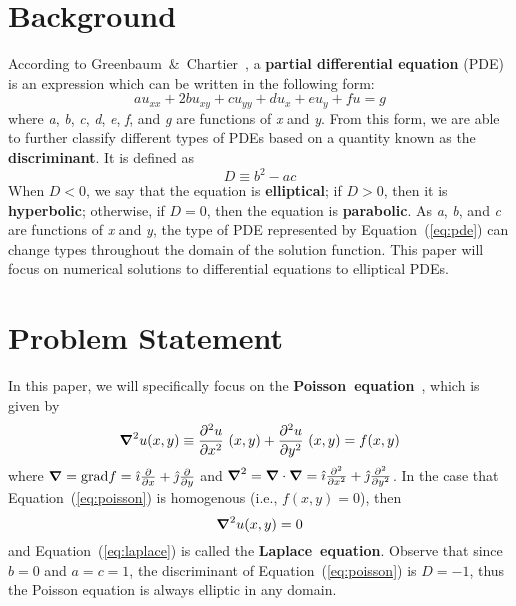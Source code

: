 \documentclass[12pt, titlepage]{article}
\title{\mytitle}
\author{Jaden Nola}
\date{2 May 2023}
\begin{document}
    \maketitle
    \section*{Background}
    According to Greenbaum~\&~Chartier~\cite{greenbaum}, a \textbf{partial differential equation} (PDE) is an expression which can be written
    in the following form:
    \begin{equation}\label{eq:pde}
        au_{xx} + 2bu_{xy} + cu_{yy} + du_{x} + eu_{y} + fu = g
    \end{equation}
    where \textit{a}, \textit{b}, \textit{c}, \textit{d}, \textit{e}, \textit{f}, and \textit{g} are functions of \textit{x} and \textit{y}.
    From this form, we are able to further classify different types of PDEs based on a quantity known as
    the \textbf{discriminant}. It is defined as
    \begin{equation}
        D \equiv b^2 - ac
    \end{equation}
    When $D < 0$, we say that the equation is \textbf{elliptical}; if $D > 0$, then it is \textbf{hyperbolic}; 
    otherwise, if $D = 0$, then the equation is \textbf{parabolic}. As \textit{a}, \textit{b}, and \textit{c} are functions of \textit{x} and \textit{y},
    the type of PDE represented by Equation~(\ref{eq:pde}) can change types throughout the domain of the solution function.
    This paper will focus on numerical solutions to differential equations to elliptical PDEs.  
    \section*{Problem Statement}
    In this paper, we will specifically focus on the \textbf{Poisson~equation}~\cite{burden_faires_2011}, which is given by
    \begin{equation}\label{eq:poisson}
        \grad^2 u(x,y) \equiv \pdv[2]{u}{x}~(x,y) + \pdv[2]{u}{y}~(x,y) = f(x,y)
    \end{equation}
    where $\grad = \text{grad}f = \hat{\imath}\pdv{x} + \hat{\jmath}\pdv{y}$ and $\grad^2 = \grad \cdot \grad = \hat{\imath}\pdv[2]{x} + \hat{\jmath}\pdv[2]{y}$.
    In the case that Equation~(\ref{eq:poisson}) is homogenous (i.e., $f(x,y)=0$), then
    \begin{equation}\label{eq:laplace}
        \grad^2 u(x,y) = 0
    \end{equation}
    and Equation~(\ref{eq:laplace}) is called the \textbf{Laplace~equation}. Observe that since $b = 0$ and $a = c = 1$, 
    the discriminant of Equation~(\ref{eq:poisson}) is $D=-1$, thus the Poisson equation is always elliptic in any domain.
\end{document}
